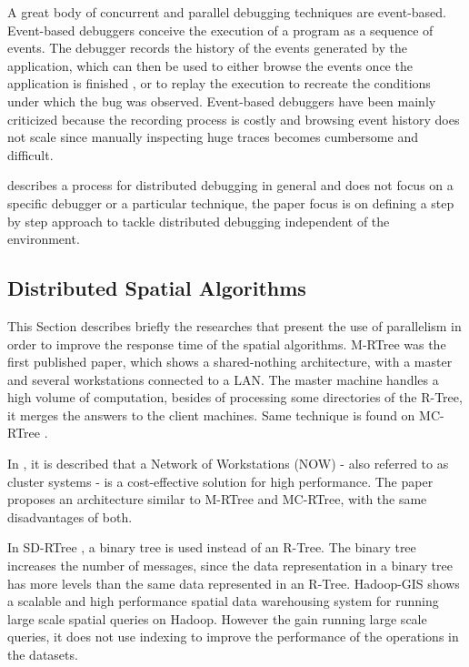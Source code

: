 A great body of concurrent and parallel debugging techniques are event-based. Event-based debuggers \cite{mcdowell1989Debugging} conceive the execution of a program as a sequence of events. The debugger records the history of the events generated by the application, which can then be used to either browse the events once the application is finished \cite{xtrace2007,causeway2009}, or to replay the execution to recreate the conditions under which the bug was observed. Event-based debuggers have been mainly criticized because the recording process is costly and browsing event history does not scale since manually inspecting huge traces becomes cumbersome and difficult.
 
\cite{cheung1990Framework} describes a process for distributed debugging in general and does not focus on a specific debugger or a particular technique, the paper focus is on defining a step by step approach to tackle distributed debugging independent of the environment. 
	
\subsection{Distributed Spatial Algorithms}
\label{spatialdist}

This Section describes briefly the researches that present the use of parallelism in order to improve the response time of the spatial algorithms. M-RTree \cite{koudas1996declustering} was the first published paper, which shows a shared-nothing architecture, with a master and several workstations connected to a LAN. The master machine handles a high volume of computation, besides of processing some directories of the R-Tree, it merges the answers to the client machines. Same technique is found on MC-RTree \cite{schnitzer1999master}.

In \cite{an1999storing}, it is described that a Network of Workstations (NOW) - also referred to as cluster systems  - is a cost-effective solution for high performance. The paper proposes an architecture similar to M-RTree and MC-RTree, with the same disadvantages of both.

In SD-RTree \cite{du2007sd}, a binary tree is used instead of an R-Tree. The binary tree increases the number of messages, since the data representation in a binary tree has more levels than the same data represented in an R-Tree. Hadoop-GIS \cite{kerr2009alternative} shows a scalable and high performance spatial data warehousing system for running large scale spatial queries on Hadoop. However the gain running large scale queries, it does not use indexing to improve the performance of the operations in the datasets.

